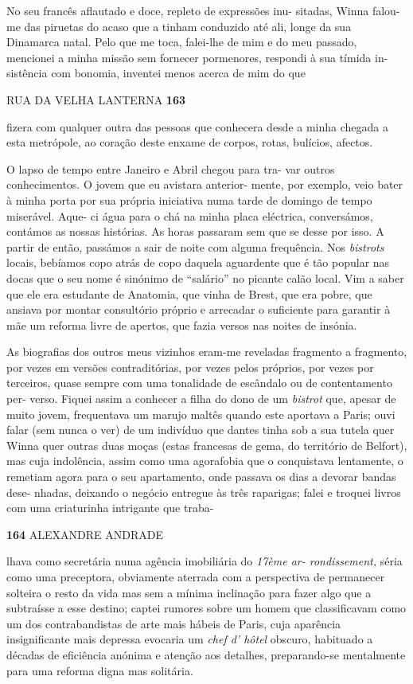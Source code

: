 No seu francês aflautado e doce, repleto de expressões inu- sitadas,
Winna falou-me das piruetas do acaso que a tinham conduzido até ali,
longe da sua Dinamarca natal. Pelo que me toca, falei-lhe de mim e do
meu passado, mencionei a minha missão sem fornecer pormenores, respondi
à sua tímida in- sistência com bonomia, inventei menos acerca de mim do
que

RUA DA VELHA LANTERNA \textbf{163}

fizera com qualquer outra das pessoas que conhecera desde a minha
chegada a esta metrópole, ao coração deste enxame de corpos, rotas,
bulícios, afectos.

O lapso de tempo entre Janeiro e Abril chegou para tra- var outros
conhecimentos. O jovem que eu avistara anterior- mente, por exemplo,
veio bater à minha porta por sua própria iniciativa numa tarde de
domingo de tempo miserável. Aque- ci água para o chá na minha placa
eléctrica, conversámos, contámos as nossas histórias. As horas passaram
sem que se desse por isso. A partir de então, passámos a sair de noite
com alguma frequência. Nos \emph{bistrots }locais, bebíamos copo atrás
de copo daquela aguardente que é tão popular nas docas que o seu nome é
sinónimo de ``salário'' no picante calão local. Vim a saber que ele era
estudante de Anatomia, que vinha de Brest, que era pobre, que ansiava
por montar consultório próprio e arrecadar o suficiente para garantir à
mãe um reforma livre de apertos, que fazia versos nas noites de insónia.

As biografias dos outros meus vizinhos eram-me reveladas fragmento a
fragmento, por vezes em versões contraditórias, por vezes pelos
próprios, por vezes por terceiros, quase sempre com uma tonalidade de
escândalo ou de contentamento per- verso. Fiquei assim a conhecer a
filha do dono de um \emph{bistrot }que, apesar de muito jovem,
frequentava um marujo maltês quando este aportava a Paris; ouvi falar
(sem nunca o ver) de um indivíduo que dantes tinha sob a sua tutela quer
Winna quer outras duas moças (estas francesas de gema, do território de
Belfort), mas cuja indolência, assim como uma agorafobia que o
conquistava lentamente, o remetiam agora para o seu apartamento, onde
passava os dias a devorar bandas dese- nhadas, deixando o negócio
entregue às três raparigas; falei e troquei livros com uma criaturinha
intrigante que traba-

\textbf{164 }ALEXANDRE ANDRADE

lhava como secretária numa agência imobiliária do \emph{17ème ar-
rondissement, }séria como uma preceptora, obviamente aterrada com a
perspectiva de permanecer solteira o resto da vida mas sem a mínima
inclinação para fazer algo que a subtraísse a esse destino; captei
rumores sobre um homem que classificavam como um dos contrabandistas de
arte mais hábeis de Paris, cuja aparência insignificante mais depressa
evocaria um \emph{chef d' hôtel }obscuro, habituado a décadas de
eficiência anónima e atenção aos detalhes, preparando-se mentalmente
para uma reforma digna mas solitária.

